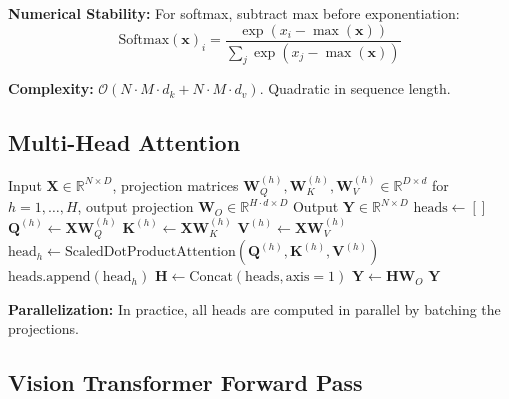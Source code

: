 \textbf{Numerical Stability:}
For softmax, subtract max before exponentiation:
\begin{equation}
\text{Softmax}(\mathbf{x})_i = \frac{\exp(x_i - \max(\mathbf{x}))}{\sum_j \exp(x_j - \max(\mathbf{x}))}
\end{equation}

\textbf{Complexity:} $\mathcal{O}(N \cdot M \cdot d_k + N \cdot M \cdot d_v)$. Quadratic in sequence length.

\subsection{Multi-Head Attention}

\begin{algorithm}[H]
\caption{Multi-Head Self-Attention}
\label{alg:multihead_attention}
\begin{algorithmic}[1]
\REQUIRE Input $\mathbf{X} \in \mathbb{R}^{N \times D}$, projection matrices $\mathbf{W}_Q^{(h)}, \mathbf{W}_K^{(h)}, \mathbf{W}_V^{(h)} \in \mathbb{R}^{D \times d}$ for $h = 1, \ldots, H$, output projection $\mathbf{W}_O \in \mathbb{R}^{H \cdot d \times D}$
\ENSURE Output $\mathbf{Y} \in \mathbb{R}^{N \times D}$
\STATE $\text{heads} \gets []$ 
\STATE
{}
    \STATE {}
    \STATE $\mathbf{Q}^{(h)} \gets \mathbf{X} \mathbf{W}_Q^{(h)}$
    \STATE $\mathbf{K}^{(h)} \gets \mathbf{X} \mathbf{W}_K^{(h)}$
    \STATE $\mathbf{V}^{(h)} \gets \mathbf{X} \mathbf{W}_V^{(h)}$
    \STATE
    \STATE {}
    \STATE $\text{head}_h \gets \text{ScaledDotProductAttention}(\mathbf{Q}^{(h)}, \mathbf{K}^{(h)}, \mathbf{V}^{(h)})$
    \STATE $\text{heads}.\text{append}(\text{head}_h)$
\ENDFOR
\STATE
\STATE {}
\STATE $\mathbf{H} \gets \text{Concat}(\text{heads}, \text{axis}=1)$ 
\STATE
\STATE {}
\STATE $\mathbf{Y} \gets \mathbf{H} \mathbf{W}_O$
\RETURN $\mathbf{Y}$
\end{algorithmic}
\end{algorithm}

\textbf{Parallelization:} In practice, all heads are computed in parallel by batching the projections.

\subsection{Vision Transformer Forward Pass}

